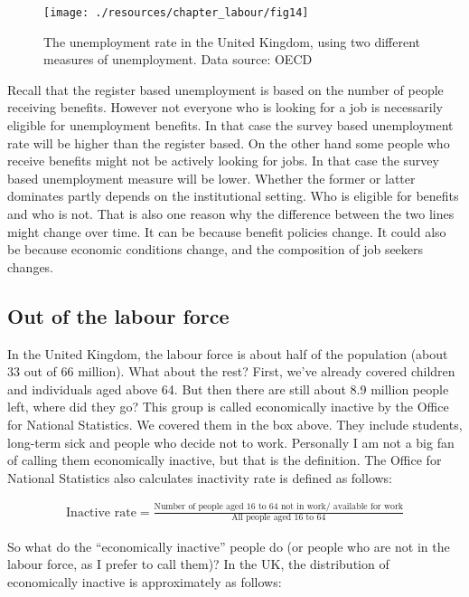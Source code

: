 \documentclass[
]{book}
\begin{document}
\begin{figure}

{\centering \texttt{[image: ./resources/chapter\_labour/fig14]} 

}

\caption{The unemployment rate in the United Kingdom, using two different measures of unemployment. Data source: OECD }\label{fig:labour2}
\end{figure}

Recall that the register based unemployment is based on the number of people receiving benefits. However not everyone who is looking for a job is necessarily eligible for unemployment benefits. In that case the survey based unemployment rate will be higher than the register based. On the other hand some people who receive benefits might not be actively looking for jobs. In that case the survey based unemployment measure will be lower. Whether the former or latter dominates partly depends on the institutional setting. Who is eligible for benefits and who is not. That is also one reason why the difference between the two lines might change over time. It can be because benefit policies change. It could also be because economic conditions change, and the composition of job seekers changes.

\hypertarget{out-of-the-labour-force}{%
\subsection{Out of the labour force}\label{out-of-the-labour-force}}

In the United Kingdom, the labour force is about half of the population (about 33 out of 66 million). What about the rest? First, we've already covered children and individuals aged above 64. But then there are still about 8.9 million people left, where did they go? This group is called economically inactive by the Office for National Statistics. We covered them in the box above. They include students, long-term sick and people who decide not to work. Personally I am not a big fan of calling them economically inactive, but that is the definition. The Office for National Statistics also calculates inactivity rate is defined as follows:

\begin{align}
  \text{Inactive rate}=\frac{\text{Number of people aged 16 to 64 not in work/ available for work}}{\text{All people aged 16 to 64}}
\end{align}

So what do the ``economically inactive'' people do (or people who are not in the labour force, as I prefer to call them)? In the UK, the distribution of economically inactive is approximately as follows:
\end{document}
